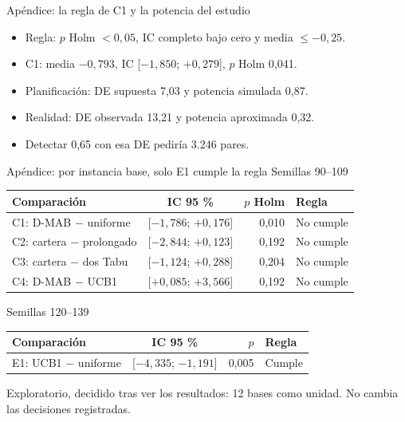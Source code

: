 \documentclass[aspectratio=169,11pt]{beamer}
\begin{document}
\begin{frame}{Apéndice: la regla de C1 y la potencia del estudio}
  \begin{itemize}
    \item Regla: $p$ Holm $<0{,}05$, IC completo bajo cero y media $\le -0{,}25$.
    \item C1: media $-0{,}793$, IC [$-1{,}850$; $+0{,}279$], $p$ Holm 0,041.
    \item Planificación: DE supuesta 7,03 y potencia simulada 0,87.
    \item Realidad: DE observada 13,21 y potencia aproximada 0,32.
    \item Detectar 0,65 con esa DE pediría 3.246 pares.
  \end{itemize}
\end{frame}

\begin{frame}{Apéndice: por instancia base, solo E1 cumple la regla}
  \centering\footnotesize
  Semillas 90--109\par\smallskip
  \begin{tabular}{@{}lcrl@{}}
    \toprule
    Comparación & IC 95 \% & $p$ Holm & Regla\\
    \midrule
    C1: D-MAB $-$ uniforme & [$-1{,}786$; $+0{,}176$] & 0,010 & No cumple\\
    C2: cartera $-$ prolongado & [$-2{,}844$; $+0{,}123$] & 0,192 & No cumple\\
    C3: cartera $-$ dos Tabu & [$-1{,}124$; $+0{,}288$] & 0,204 & No cumple\\
    C4: D-MAB $-$ UCB1 & [$+0{,}085$; $+3{,}566$] & 0,192 & No cumple\\
    \bottomrule
  \end{tabular}

  \bigskip
  Semillas 120--139\par\smallskip
  \begin{tabular}{@{}lcrl@{}}
    \toprule
    Comparación & IC 95 \% & $p$ & Regla\\
    \midrule
    E1: UCB1 $-$ uniforme & [$-4{,}335$; $-1{,}191$] & 0,005 & Cumple\\
    \bottomrule
  \end{tabular}

  \bigskip
  {\scriptsize Exploratorio, decidido tras ver los resultados: 12 bases como unidad.
  No cambia las decisiones registradas.}
\end{frame}
\end{document}
